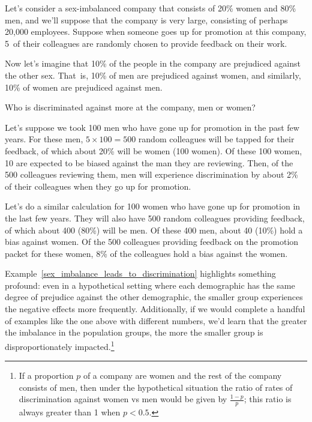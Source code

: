 \begin{examplewrap}
\begin{nexample}{Let's consider a sex-imbalanced
    company that consists of 20\% women
    and 80\% men,\footnotemark{}
    and we'll suppose that the
    company is very large, consisting of perhaps
    20,000 employees.
    Suppose when someone goes up for promotion at this
    company, 5~of their colleagues are randomly chosen
    to provide feedback on their work.
    \exspace{}

    Now let's imagine that 10\% of the people in the
    company are prejudiced against the other sex.
    That~is, 10\% of men are prejudiced against women,
    and similarly, 10\% of women are prejudiced against men.
    \exspace{}
    
    Who is discriminated against more at the company,
    men or women?}
  \label{sex_imbalance_leads_to_discrimination}%
  Let's suppose we took 100 men who have gone up for
  promotion in the past few years.
  For these men, $5 \times 100 = 500$ random colleagues
  will be tapped for their feedback, of which
  about 20\% will be women (100 women).
  Of these 100 women, 10 are expected to be biased
  against the man they are reviewing.
  Then, of the 500 colleagues reviewing them,
  men will experience
  discrimination by about 2\% of their colleagues when
  they go up for promotion.

  Let's do a similar calculation for 100 women
  who have gone up for promotion in the last few years.
  They will also have 500 random colleagues providing
  feedback, of which about 400 (80\%) will be men.
  Of these 400 men, about 40 (10\%) hold a bias against
  women.
  Of the 500 colleagues providing feedback on the
  promotion packet for these women, 8\% of the
  colleagues hold a bias against the women.
\end{nexample}
\end{examplewrap}

Example~\ref{sex_imbalance_leads_to_discrimination}
highlights something profound:
even in a hypothetical setting where each demographic
has the same degree of prejudice
against the other demographic, the smaller group
experiences the negative effects more frequently.
Additionally, if we would complete a handful of examples
like the one above with different numbers,
we'd learn that the greater the imbalance
in the population groups, the more the smaller group
is disproportionately impacted.\footnote{%
  If a proportion $p$ of a company are
  women and the rest of the company consists of men,
  then under the hypothetical situation
  the ratio of rates of discrimination against women
  vs men would be given by $\frac{1 - p}{p}$;
  this ratio is always greater than 1 when $p < 0.5$.}%

